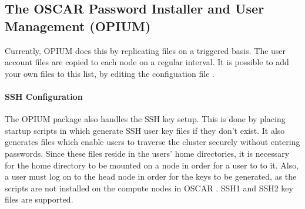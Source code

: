 %
%
%

\subsection{The OSCAR Password Installer and User Management (OPIUM)}
\label{app:opium-overview}

Currently, OPIUM does this by replicating files on a triggered basis.
The user account files are copied to each node on a regular interval.
It is possible to add your own files to this list, by editing the
configuation file .

\paragraph{SSH Configuration}

The OPIUM package also handles the SSH key setup.  This is done by
placing startup scripts in  which generate SSH
user key files if they don't exist.  It also generates
 files which enable users to traverse the
cluster securely without entering passwords.  Since these files reside
in the users' home directories, it is necessary for the home directory
to be mounted on a node in order for a user to  to it.  Also,
a user must log on to the head node in order for the keys to be
generated, as the  scripts are not installed on
the compute nodes in OSCAR \oscarversion.  SSH1 and SSH2 key files are
supported.

